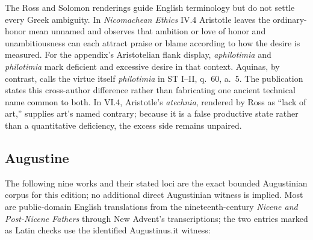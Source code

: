 The Ross and Solomon renderings guide English terminology but do not settle every Greek ambiguity. In \emph{Nicomachean Ethics} IV.4 Aristotle leaves the ordinary-honor mean unnamed and observes that ambition or love of honor and unambitiousness can each attract praise or blame according to how the desire is measured. For the appendix's Aristotelian flank display, \emph{aphilotimia} and \emph{philotimia} mark deficient and excessive desire in that context. Aquinas, by contrast, calls the virtue itself \emph{philotimia} in ST I--II, q.~60, a.~5. The publication states this cross-author difference rather than fabricating one ancient technical name common to both. In VI.4, Aristotle's \emph{atechnia}, rendered by Ross as “lack of art,” supplies art's named contrary; because it is a false productive state rather than a quantitative deficiency, the excess side remains unpaired.

\subsection{Augustine}

The following nine works and their stated loci are the exact bounded Augustinian corpus for this edition; no additional direct Augustinian witness is implied. Most are public-domain English translations from the nineteenth-century \emph{Nicene and Post-Nicene Fathers} through New Advent's transcriptions; the two entries marked as Latin checks use the identified Augustinus.it witness:

